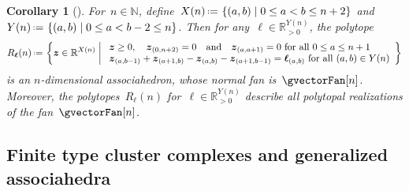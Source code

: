 \documentclass{amsart}
\newtheorem{corollary}[theorem]{Corollary}
\theoremstyle{definition}
\newcommand{\R}{\mathbb{R}} %
\newcommand{\N}{\mathbb{N}} %
\renewcommand{\b}[1]{{\boldsymbol{#1}}} %
\newcommand{\set}[2]{\left\{ #1 \;\middle|\; #2 \right\}} %
\newcommand{\bigset}[2]{\big\{ #1 \;\big|\; #2 \big\}} %
\newcommand{\eqdef}{\mbox{\,\raisebox{0.2ex}{\scriptsize\ensuremath{\mathrm:}}\ensuremath{=}\,}} %
\newcommand{\vincent}[1]{\todo[color=blue!30]{#1 \\ \hfill --- V.}}
\begin{document}
\begin{corollary}[{\cite[Sect.~3.2]{ArkaniHamedBaiHeYan}}]
\label{coro:allPolytopalRealizationsAsso}
For~$n \in \N$, define~$X(n) \eqdef \set{(a,b)}{0 \le a < b \le n+2}$ and~$Y(n) \eqdef \set{(a,b)}{0 \le a < b-2 \le n}$.
Then for any~$\b{\ell} \in \R_{>0}^{Y(n)}$, the polytope
\[
R_\b{\ell}(n) \eqdef \set{\b{z} \in \R^{X(n)}}{\begin{array}{l} \b{z} \ge 0, \quad \b{z}_{(0,n+2)} = 0 \quad\text{and}\quad \b{z}_{(a,a+1)} = 0 \text{ for all } 0 \le a \le n+1 \\ \b{z}_{(a,b-1)} + \b{z}_{(a+1,b)} - \b{z}_{(a,b)} - \b{z}_{(a+1,b-1)} = \b{\ell}_{(a,b)} \text{ for all } (a,b) \in Y(n) \end{array}}
\]
is an $n$-dimensional associahedron, whose normal fan is~$\gvectorFan[n]$.
Moreover, the polytopes~$R_\b{\ell}(n)$ for~$\b{\ell} \in \R_{>0}^{Y(n)}$ describe all polytopal realizations of the fan~$\gvectorFan[n]$.
\end{corollary}



\subsection{Finite type cluster complexes and generalized associahedra}
\label{subsec:typeConeCA}
\end{document}
